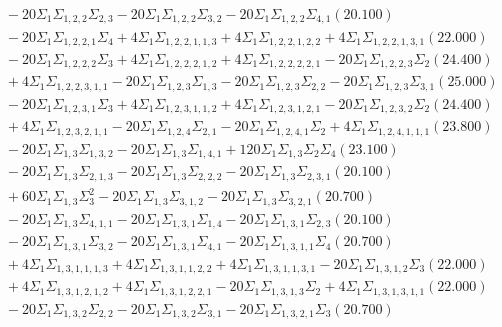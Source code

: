 \documentclass[12pt]{article}
\begin{document}
\begin{landscape}
\begin{align*}
		&\quad\quad -20\Sigma_{1}\Sigma_{1,2,2}\Sigma_{2,3}-20\Sigma_{1}\Sigma_{1,2,2}\Sigma_{3,2}-20\Sigma_{1}\Sigma_{1,2,2}\Sigma_{4,1}(20.100) \\ 
		&\quad\quad -20\Sigma_{1}\Sigma_{1,2,2,1}\Sigma_{4}+4\Sigma_{1}\Sigma_{1,2,2,1,1,3}+4\Sigma_{1}\Sigma_{1,2,2,1,2,2}+4\Sigma_{1}\Sigma_{1,2,2,1,3,1}(22.000) \\ 
		&\quad\quad -20\Sigma_{1}\Sigma_{1,2,2,2}\Sigma_{3}+4\Sigma_{1}\Sigma_{1,2,2,2,1,2}+4\Sigma_{1}\Sigma_{1,2,2,2,2,1}-20\Sigma_{1}\Sigma_{1,2,2,3}\Sigma_{2}(24.400) \\ 
		&\quad\quad +4\Sigma_{1}\Sigma_{1,2,2,3,1,1}-20\Sigma_{1}\Sigma_{1,2,3}\Sigma_{1,3}-20\Sigma_{1}\Sigma_{1,2,3}\Sigma_{2,2}-20\Sigma_{1}\Sigma_{1,2,3}\Sigma_{3,1}(25.000) \\ 
		&\quad\quad -20\Sigma_{1}\Sigma_{1,2,3,1}\Sigma_{3}+4\Sigma_{1}\Sigma_{1,2,3,1,1,2}+4\Sigma_{1}\Sigma_{1,2,3,1,2,1}-20\Sigma_{1}\Sigma_{1,2,3,2}\Sigma_{2}(24.400) \\ 
		&\quad\quad +4\Sigma_{1}\Sigma_{1,2,3,2,1,1}-20\Sigma_{1}\Sigma_{1,2,4}\Sigma_{2,1}-20\Sigma_{1}\Sigma_{1,2,4,1}\Sigma_{2}+4\Sigma_{1}\Sigma_{1,2,4,1,1,1}(23.800) \\ 
		&\quad\quad -20\Sigma_{1}\Sigma_{1,3}\Sigma_{1,3,2}-20\Sigma_{1}\Sigma_{1,3}\Sigma_{1,4,1}+120\Sigma_{1}\Sigma_{1,3}\Sigma_{2}\Sigma_{4}(23.100) \\ 
		&\quad\quad -20\Sigma_{1}\Sigma_{1,3}\Sigma_{2,1,3}-20\Sigma_{1}\Sigma_{1,3}\Sigma_{2,2,2}-20\Sigma_{1}\Sigma_{1,3}\Sigma_{2,3,1}(20.100) \\ 
		&\quad\quad +60\Sigma_{1}\Sigma_{1,3}\Sigma_{3}^{2}-20\Sigma_{1}\Sigma_{1,3}\Sigma_{3,1,2}-20\Sigma_{1}\Sigma_{1,3}\Sigma_{3,2,1}(20.700) \\ 
		&\quad\quad -20\Sigma_{1}\Sigma_{1,3}\Sigma_{4,1,1}-20\Sigma_{1}\Sigma_{1,3,1}\Sigma_{1,4}-20\Sigma_{1}\Sigma_{1,3,1}\Sigma_{2,3}(20.100) \\ 
		&\quad\quad -20\Sigma_{1}\Sigma_{1,3,1}\Sigma_{3,2}-20\Sigma_{1}\Sigma_{1,3,1}\Sigma_{4,1}-20\Sigma_{1}\Sigma_{1,3,1,1}\Sigma_{4}(20.700) \\ 
		&\quad\quad +4\Sigma_{1}\Sigma_{1,3,1,1,1,3}+4\Sigma_{1}\Sigma_{1,3,1,1,2,2}+4\Sigma_{1}\Sigma_{1,3,1,1,3,1}-20\Sigma_{1}\Sigma_{1,3,1,2}\Sigma_{3}(22.000) \\ 
		&\quad\quad +4\Sigma_{1}\Sigma_{1,3,1,2,1,2}+4\Sigma_{1}\Sigma_{1,3,1,2,2,1}-20\Sigma_{1}\Sigma_{1,3,1,3}\Sigma_{2}+4\Sigma_{1}\Sigma_{1,3,1,3,1,1}(22.000) \\ 
		&\quad\quad -20\Sigma_{1}\Sigma_{1,3,2}\Sigma_{2,2}-20\Sigma_{1}\Sigma_{1,3,2}\Sigma_{3,1}-20\Sigma_{1}\Sigma_{1,3,2,1}\Sigma_{3}(20.700) \\ 

\end{align*}
\end{landscape}
\end{document}
